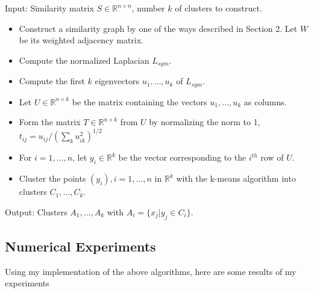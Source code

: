 \documentclass[10pt,a4paper, nocenter]{report}
\begin{document}
	Input: Similarity matrix $S \in \mathbb{R}^{n\times n}$, number $k$ of clusters to construct.
	\begin{itemize}
		\item Construct a similarity graph by one of the ways described in Section 2. Let $W$ be its weighted adjacency matrix.
		\item Compute the normalized Laplacian $L_{sym}$.
		\item Compute the first $k$ eigenvectors $u_{1},\dots, u_{k} $ of $L_{sym}$.
		\item Let $U \in \mathbb{R}^{n\times k}$ be the matrix containing the vectors $u_{1},\dots, u_{k}$ as columns.
		\item Form the matrix $T \in \mathbb{R}^{n\times k}$ from $U$ by normalizing the norm to 1, $t_{ij} = u_{ij}/(\sum_{k}u_{ik}^2)^{1/2}$
		\item For $i = 1,\dots, n$, let $y_{i} \in \mathbb{R}^k$ be the vector corresponding to the $i^{th}$ row of $U$.
		\item Cluster the points $(y_{i}), i=1,\dots,n$ in $\mathbb{R}^k$ with the k-means algorithm into clusters $C_{1},\dots, C_{k}$.
	\end{itemize} Output: Clusters $A_{1},\dots, A_{k}$ with $A_{i} = \{x_{j}| y_{j} \in C_{i}\}$.

    \subsection{Numerical Experiments}

    Using my implementation of the above algorithms, here are some results of my experiments
\end{document}
